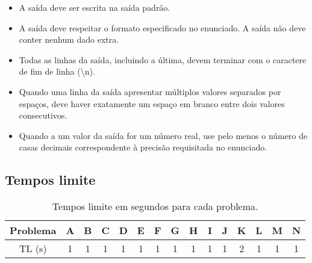 \begin{itemize}

\item A saída deve ser escrita na saída padrão.

\item A saída deve respeitar o formato especificado no enunciado. A saída não deve
conter nenhum dado extra.

\item Todas as linhas da saída, incluindo a última, devem terminar com o caractere de fim
de linha (\textbackslash n).

\item Quando uma linha da saída apresentar múltiplos valores separados por espaços, deve haver
exatamente um espaço em branco entre dois valores consecutivos.

\item Quando a um valor da saída for um número real, use pelo menos o número de casas decimais correspondente
à precisão requisitada no enunciado.

\end{itemize}

\subsection*{Tempos limite}

\begin{table}[h!]
	\centering
	\begin{tabular}{c|c|c|c|c|c|c|c|c|c|c|c|c|c|c}
		Problema & A & B & C & D & E & F & G & H & I & J & K & L & M & N \\
		\hline
		TL (s) & 1 & 1 & 1 & 1 & 1 & 1 & 1 & 1 & 1 & 1 & 2 & 1 & 1 & 1
	\end{tabular}
    \caption{Tempos limite em segundos para cada problema.}
\end{table}
